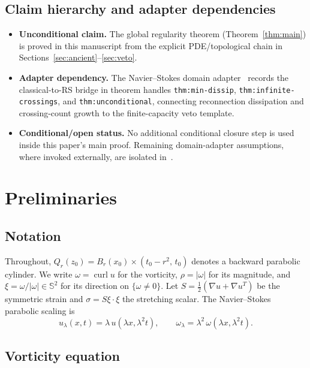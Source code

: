 \documentclass[12pt, reqno]{amsart}
\theoremstyle{definition}
\theoremstyle{remark}
\numberwithin{equation}{section}
\newcommand{\Sbb}{\mathbb{S}}
\DeclareMathOperator{\curl}{curl}
\begin{document}
\subsection{Claim hierarchy and adapter dependencies}

\begin{itemize}[leftmargin=2em]
\item \textbf{Unconditional claim.}
The global regularity theorem (Theorem~\ref{thm:main}) is proved in this
manuscript from the explicit PDE/topological chain in
Sections~\ref{sec:ancient}--\ref{sec:veto}.
\item \textbf{Adapter dependency.}
The Navier--Stokes domain adapter~\cite{FA2NSAdapter} records the
classical-to-RS bridge in theorem handles
\texttt{thm:min-dissip}, \texttt{thm:infinite-crossings}, and
\texttt{thm:unconditional}, connecting reconnection dissipation and
crossing-count growth to the finite-capacity veto template.
\item \textbf{Conditional/open status.}
No additional conditional closure step is used inside this paper's main
proof. Remaining domain-adapter assumptions, where invoked externally,
are isolated in~\cite{FA2NSAdapter}.
\end{itemize}

\section{Preliminaries}\label{sec:prelim}

\subsection{Notation}

Throughout, $Q_r(z_0)=B_r(x_0)\times(t_0-r^2,\,t_0)$ denotes a
backward parabolic cylinder.
We write $\omega=\curl u$ for the vorticity, $\rho=|\omega|$ for its
magnitude, and $\xi=\omega/|\omega|\in\Sbb^2$ for its direction on
$\{\omega\neq 0\}$.  Let $S=\tfrac12(\nabla u+\nabla u^T)$ be the
symmetric strain and $\sigma=S\xi\cdot\xi$ the stretching scalar.
The Navier--Stokes parabolic scaling is
\begin{equation}\label{eq:scaling}
u_\lambda(x,t)=\lambda\,u(\lambda x,\lambda^2 t),\qquad
\omega_\lambda=\lambda^2\,\omega(\lambda x,\lambda^2 t).
\end{equation}

\subsection{Vorticity equation}
\end{document}
